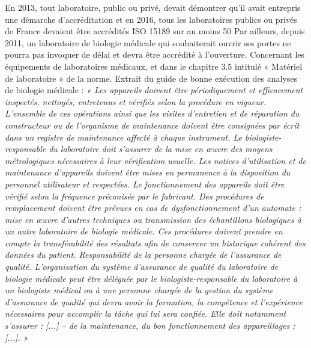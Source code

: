 En 2013, tout laboratoire, public ou privé, devait démontrer qu'il avait entrepris une démarche d'accréditation et en 2016, tous les laboratoires publics ou privés de France devaient être accrédités ISO 15189 sur au moins 50 %
Par ailleurs, depuis 2011, un laboratoire de biologie médicale qui souhaiterait ouvrir ses portes ne pourra pas invoquer de délai et devra être accrédité à l'ouverture.
Concernant les équipements de laboratoires médicaux, et dans le chapitre 3.5 intitulé « Matériel de laboratoire » de la norme. Extrait du guide de bonne exécution des analyses de biologie médicale : \textit{« Les appareils doivent être périodiquement et efficacement inspectés, nettoyés, entretenus et vérifiés selon la procédure en vigueur. L'ensemble de ces opérations ainsi que les visites d'entretien et de réparation du constructeur ou de l'organisme de maintenance doivent être consignées par écrit dans un registre de maintenance affecté à chaque instrument. Le biologiste-responsable du laboratoire doit s'assurer de la mise en œuvre des moyens métrologiques nécessaires à leur vérification usuelle. Les notices d'utilisation et de maintenance d'appareils doivent être mises en permanence à la disposition du personnel utilisateur et respectées. Le fonctionnement des appareils doit être vérifié selon la fréquence préconisée par le fabricant.
Des procédures de remplacement doivent être prévues en cas de dysfonctionnement d'un automate : mise en œuvre d'autres techniques ou transmission des échantillons biologiques à un autre laboratoire de biologie médicale. Ces procédures doivent prendre en compte la transférabilité des résultats afin de conserver un historique cohérent des données du patient. Responsabilité de la personne chargée de l'assurance de qualité.
L'organisation du système d'assurance de qualité du laboratoire de biologie médicale peut être déléguée par le biologiste-responsable du laboratoire à un biologiste médical ou à une personne chargée de la gestion du système d'assurance de qualité qui devra avoir la formation, la compétence et l'expérience nécessaires pour accomplir la tâche qui lui sera confiée. Elle doit notamment s'assurer : [...] – de la maintenance, du bon fonctionnement des appareillages ; [...]. »}\cite{guide_maint}
\pagebreak